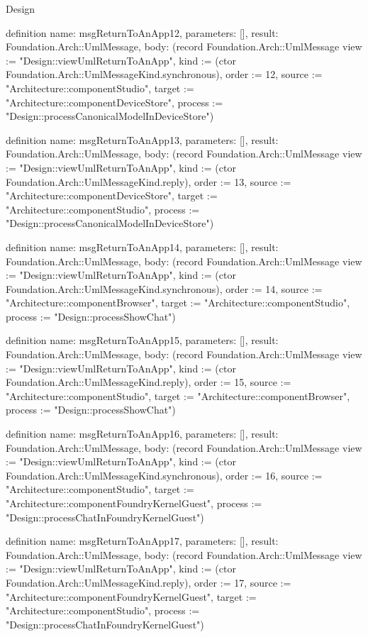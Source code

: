 \begin{lexlean}{Design}
\begin{semanticmodule}
definition{
  name: msgReturnToAnApp12,
  parameters: [],
  result: Foundation.Arch::UmlMessage,
  body: (record Foundation.Arch::UmlMessage {view := "Design::viewUmlReturnToAnApp", kind := (ctor Foundation.Arch::UmlMessageKind.synchronous), order := 12, source := "Architecture::componentStudio", target := "Architecture::componentDeviceStore", process := "Design::processCanonicalModelInDeviceStore"})
}

definition{
  name: msgReturnToAnApp13,
  parameters: [],
  result: Foundation.Arch::UmlMessage,
  body: (record Foundation.Arch::UmlMessage {view := "Design::viewUmlReturnToAnApp", kind := (ctor Foundation.Arch::UmlMessageKind.reply), order := 13, source := "Architecture::componentDeviceStore", target := "Architecture::componentStudio", process := "Design::processCanonicalModelInDeviceStore"})
}

definition{
  name: msgReturnToAnApp14,
  parameters: [],
  result: Foundation.Arch::UmlMessage,
  body: (record Foundation.Arch::UmlMessage {view := "Design::viewUmlReturnToAnApp", kind := (ctor Foundation.Arch::UmlMessageKind.synchronous), order := 14, source := "Architecture::componentBrowser", target := "Architecture::componentStudio", process := "Design::processShowChat"})
}

definition{
  name: msgReturnToAnApp15,
  parameters: [],
  result: Foundation.Arch::UmlMessage,
  body: (record Foundation.Arch::UmlMessage {view := "Design::viewUmlReturnToAnApp", kind := (ctor Foundation.Arch::UmlMessageKind.reply), order := 15, source := "Architecture::componentStudio", target := "Architecture::componentBrowser", process := "Design::processShowChat"})
}

definition{
  name: msgReturnToAnApp16,
  parameters: [],
  result: Foundation.Arch::UmlMessage,
  body: (record Foundation.Arch::UmlMessage {view := "Design::viewUmlReturnToAnApp", kind := (ctor Foundation.Arch::UmlMessageKind.synchronous), order := 16, source := "Architecture::componentStudio", target := "Architecture::componentFoundryKernelGuest", process := "Design::processChatInFoundryKernelGuest"})
}

definition{
  name: msgReturnToAnApp17,
  parameters: [],
  result: Foundation.Arch::UmlMessage,
  body: (record Foundation.Arch::UmlMessage {view := "Design::viewUmlReturnToAnApp", kind := (ctor Foundation.Arch::UmlMessageKind.reply), order := 17, source := "Architecture::componentFoundryKernelGuest", target := "Architecture::componentStudio", process := "Design::processChatInFoundryKernelGuest"})
}


\end{semanticmodule}
\end{lexlean}
